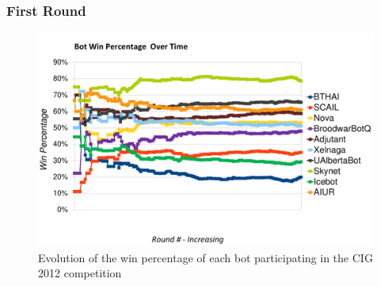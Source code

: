 \documentclass{llncs}
\begin{document}
\subsubsection{First Round}
\label{sec:cig-first-round}

\begin{figure}[t]
    \centering
    \includegraphics[width=\columnwidth]{figures/cig2012-ResultsRound90.pdf}
    \caption{Evolution of the win percentage of each bot participating in the
CIG 2012 competition}
    \label{fig:cig2012-results}
\end{figure}
\end{document}
